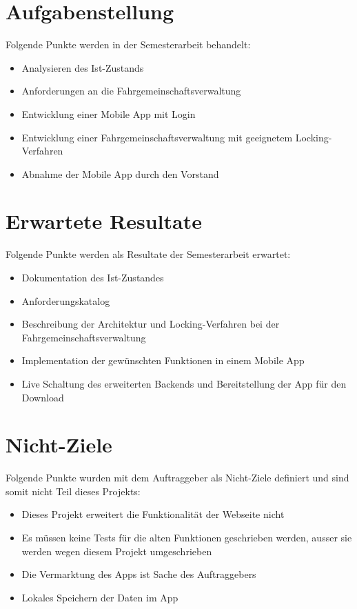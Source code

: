 \section{Aufgabenstellung}\label{aufgabenstellung}
Folgende Punkte werden in der Semesterarbeit behandelt:
\begin{itemize}
\item Analysieren des Ist-Zustands
\item Anforderungen an die Fahrgemeinschaftsverwaltung
\item Entwicklung einer Mobile App mit Login
\item Entwicklung einer Fahrgemeinschaftsverwaltung mit geeignetem Locking-Verfahren
\item Abnahme der Mobile App durch den Vorstand
\end{itemize}

\section{Erwartete Resultate}\label{erwartete_resultate}
Folgende Punkte werden als Resultate der Semesterarbeit erwartet:
\begin{itemize}
\item Dokumentation des Ist-Zustandes
\item Anforderungskatalog
\item Beschreibung der Architektur und Locking-Verfahren bei der Fahrgemeinschaftsverwaltung
\item Implementation der gewünschten Funktionen in einem Mobile App
\item Live Schaltung des erweiterten Backends und Bereitstellung der App für den Download
\end{itemize}

\section{Nicht-Ziele}\label{nicht_ziele}
Folgende Punkte wurden mit dem Auftraggeber als Nicht-Ziele definiert und sind somit nicht Teil dieses Projekts:
\begin{itemize}
\item Dieses Projekt erweitert die Funktionalität der Webseite nicht
\item Es müssen keine Tests für die alten Funktionen geschrieben werden, ausser sie werden wegen diesem Projekt umgeschrieben
\item Die Vermarktung des Apps ist Sache des Auftraggebers
\item Lokales Speichern der Daten im App
\end{itemize}

